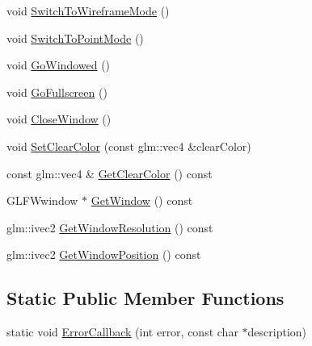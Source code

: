 \begin{DoxyCompactItemize}
\item 
void \mbox{\hyperlink{classec_1_1_window_a5176dd1ed33f621b4eb8f71eb64cccad}{Switch\+To\+Wireframe\+Mode}} ()
\item 
void \mbox{\hyperlink{classec_1_1_window_adaf30fde0a52c772d3b089746fd6397a}{Switch\+To\+Point\+Mode}} ()
\item 
void \mbox{\hyperlink{classec_1_1_window_a33339ac52b268b577d21dc9248e59935}{Go\+Windowed}} ()
\item 
void \mbox{\hyperlink{classec_1_1_window_af6345e0c05937b769936e714f154623e}{Go\+Fullscreen}} ()
\item 
void \mbox{\hyperlink{classec_1_1_window_a6605c513a7dbab0b43ddfad6ff7ac55a}{Close\+Window}} ()
\item 
void \mbox{\hyperlink{classec_1_1_window_af0d59d99e745ebde21fed3b165543a52}{Set\+Clear\+Color}} (const glm\+::vec4 \&clear\+Color)
\item 
const glm\+::vec4 \& \mbox{\hyperlink{classec_1_1_window_aa87fd9b3042657bc41461c1234296847}{Get\+Clear\+Color}} () const
\item 
G\+L\+F\+Wwindow $\ast$ \mbox{\hyperlink{classec_1_1_window_a3131064635c5c422ac65b17eeaddae59}{Get\+Window}} () const
\item 
glm\+::ivec2 \mbox{\hyperlink{classec_1_1_window_ab8dde6eac2f340b3a31cadf764f664f1}{Get\+Window\+Resolution}} () const
\item 
glm\+::ivec2 \mbox{\hyperlink{classec_1_1_window_a04959818ec9c89bb982deefa5868cab5}{Get\+Window\+Position}} () const
\end{DoxyCompactItemize}
\subsection*{Static Public Member Functions}
\begin{DoxyCompactItemize}
\item 
static void \mbox{\hyperlink{classec_1_1_window_ad8b192b0b757ec15d233d65e52dedc2c}{Error\+Callback}} (int error, const char $\ast$description)
\end{DoxyCompactItemize}
